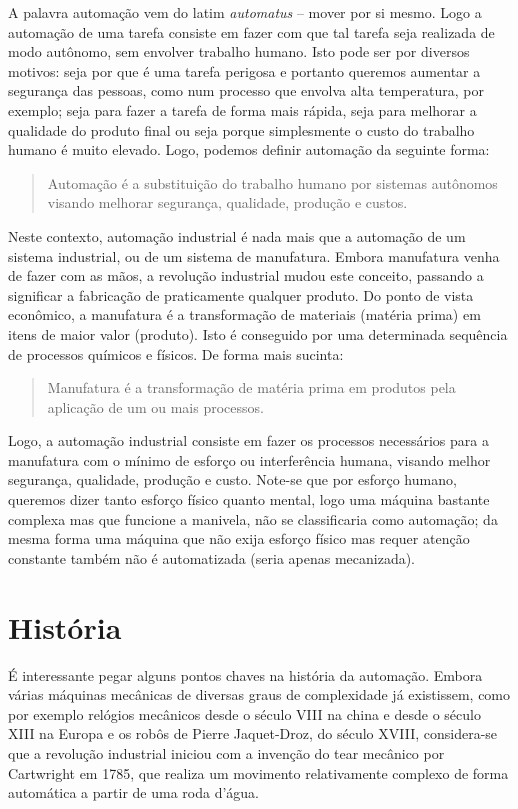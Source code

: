 A palavra automação vem do latim \emph{automatus} -- mover por si mesmo. Logo a automação de uma tarefa consiste em fazer com que tal tarefa seja realizada de modo autônomo, sem envolver trabalho humano. Isto pode ser por diversos motivos: seja por que é uma tarefa perigosa e portanto queremos aumentar a segurança das pessoas, como num processo que envolva alta temperatura, por exemplo; seja para fazer a tarefa de forma mais rápida, seja para melhorar a qualidade do produto final ou seja porque simplesmente o custo do trabalho humano é muito elevado. Logo, podemos definir automação da seguinte forma:
\begin{quote}
  Automação é a substituição do trabalho humano por sistemas autônomos visando melhorar segurança, qualidade, produção e custos.
\end{quote}

Neste contexto, automação industrial é nada mais que a automação de um sistema industrial, ou de um sistema de manufatura. Embora manufatura venha de fazer com as mãos, a revolução industrial mudou este conceito, passando a significar a fabricação de praticamente qualquer produto. Do ponto de vista econômico, a manufatura é a transformação de materiais (matéria prima) em itens de maior valor (produto). Isto é conseguido por uma determinada sequência de processos químicos e físicos. De forma mais sucinta:
\begin{quote}
	Manufatura é a transformação de matéria prima em produtos pela aplicação de um ou mais processos.
\end{quote}

Logo, a automação industrial consiste em fazer os processos necessários para a manufatura com o mínimo de esforço ou interferência humana, visando melhor segurança, qualidade, produção e custo. Note-se que por esforço humano, queremos dizer tanto esforço físico quanto mental, logo uma máquina bastante complexa mas que funcione a manivela, não se classificaria como automação; da mesma forma uma máquina que não exija esforço físico mas requer atenção constante também não é automatizada (seria apenas mecanizada).

\section{História}
É interessante pegar alguns pontos chaves na história da automação. Embora várias máquinas mecânicas de diversas graus de complexidade já existissem, como por exemplo relógios mecânicos desde o século VIII na china e desde o século XIII na Europa e os robôs de Pierre Jaquet-Droz, do século XVIII, considera-se que a revolução industrial iniciou com a invenção do tear mecânico por Cartwright em 1785, que realiza um movimento relativamente complexo de forma automática a partir de uma roda d'água.

